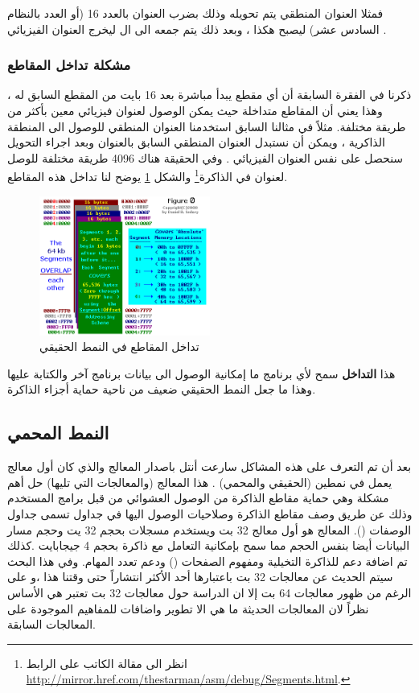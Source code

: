 \documentclass[document.tex]{subfiles}
\begin{document}
فمثلا العنوان المنطقي  يتم تحويله وذلك بضرب العنوان  بالعدد 16 (أو العدد  بالنظام السادس عشر) ليصبح هكذا ، وبعد ذلك يتم جمعه الى ال  ليخرج العنوان الفيزيائي .  

\subsubsection{مشكلة تداخل المقاطع}
ذكرنا في الفقرة السابقة أن أي مقطع يبدأ مباشرة بعد 16 بايت من المقطع السابق له ، وهذا يعني أن المقاطع متداخلة حيث يمكن الوصول لعنوان فيزيائي معين بأكثر من طريقة مختلفة. مثلاً في مثالنا السابق استخدمنا العنوان المنطقي  للوصول الى المنطقة الذاكرية  ، ويمكن أن نستبدل العنوان المنطقي السابق بالعنوان  وبعد اجراء التحويل سنحصل على نفس العنوان الفيزيائي . وفي الحقيقة هناك 4096 طريقة مختلفة للوصل لعنوان في الذاكرة\footnote{انظر الى مقالة الكاتب  على الرابط \url{http://mirror.href.com/thestarman/asm/debug/Segments.html}.} والشكل \ref{fig:mem_seg} يوضح لنا تداخل هذه المقاطع.

\begin{figure}[h!]
  \label{fig:mem_seg} 
  \caption{تداخل المقاطع في النمط الحقيقي}
  \centering
   \includegraphics[width=0.5\textwidth]{../img/mem_seg}
\end{figure}

هذا \textbf{التداخل } سمح لأي برنامج ما إمكانية الوصول الى بيانات برنامج آخر والكتابة عليها وهذا ما جعل النمط الحقيقي ضعيف من ناحية حماية أجزاء الذاكرة.

\subsection{النمط المحمي }
بعد أن تم التعرف على هذه المشاكل سارعت أنتل باصدار المعالج  والذي كان أول معالج يعمل في نمطين (الحقيقي والمحمي) . هذا المعالج (والمعالجات التي تليها) حل أهم مشكلة وهي حماية مقاطع الذاكرة من الوصول العشوائي من قبل برامج المستخدم وذلك عن طريق وصف مقاطع الذاكرة وصلاحيات الوصول اليها في جداول تسمى جداول الوصفات (). المعالج  هو أول معالج 32 بت ويستخدم مسجلات بحجم 32 يت وحجم مسار البيانات أيضا بنفس الحجم مما سمح بإمكانية التعامل مع ذاكرة بحجم 4 جيجابايت .كذلك تم اضافة دعم للذاكرة التخيلية ومفهوم الصفحات () ودعم تعدد المهام. وفي هذا البحث سيتم الحديث عن معالجات 32 بت باعتبارها أحد الأكثر انتشاراً حتى وقتنا هذا ،و على الرغم من ظهور معالجات 64 بت إلا ان الدراسة حول معالجات 32 بت تعتبر هي الأساس نظراً لان المعالجات الحديثة ما هي الا تطوير واضافات للمفاهيم الموجودة على المعالجات السابقة.
\end{document}
